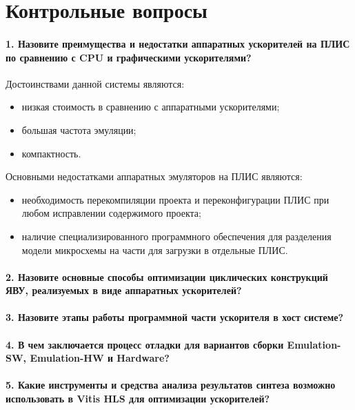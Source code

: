 \chapter*{Контрольные вопросы}

\subsubsection{1. Назовите преимущества и недостатки аппаратных ускорителей на ПЛИС по сравнению с CPU и графическими ускорителями?}
Достоинствами данной системы являются:
\begin{itemize}
	\item низкая стоимость в сравнению с аппаратными ускорителями;
	\item большая частота эмуляции;
	\item компактность.
\end{itemize}

Основными недостатками аппаратных эмуляторов на ПЛИС являются: 
\begin{itemize}
	\item необходимость перекомпиляции проекта и переконфигурации ПЛИС при любом исправлении содержимого проекта;
	\item наличие специализированного программного обеспечения для разделения модели микросхемы на части для загрузки в отдельные ПЛИС.
\end{itemize}


\subsubsection{2. Назовите основные способы оптимизации циклических конструкций ЯВУ, реализуемых в виде аппаратных ускорителей?}


\subsubsection{3. Назовите этапы работы программной части ускорителя в хост системе?}


\subsubsection{4. В чем заключается процесс отладки для вариантов сборки Emulation-SW, Emulation-HW и Hardware?}


\subsubsection{5. Какие инструменты и средства анализа результатов синтеза возможно использовать в Vitis HLS для оптимизации ускорителей?}
